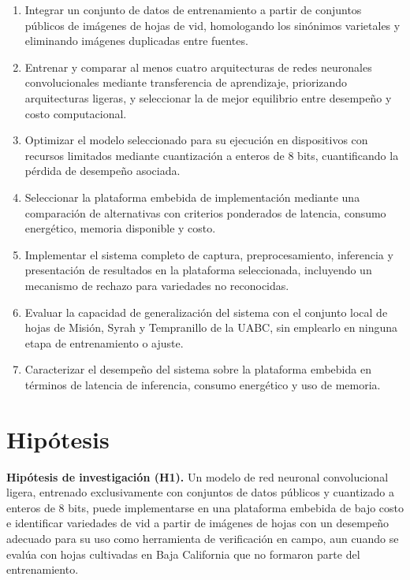 {\renewcommand{\labelenumi}{\textbf{OE\arabic{enumi}.}}
\begin{enumerate}
    \item Integrar un conjunto de datos de entrenamiento a partir de
    conjuntos públicos de imágenes de hojas de vid, homologando los
    sinónimos varietales y eliminando imágenes duplicadas entre fuentes.
    \item Entrenar y comparar al menos cuatro arquitecturas de redes
    neuronales convolucionales mediante transferencia de aprendizaje,
    priorizando arquitecturas ligeras, y seleccionar la de mejor equilibrio
    entre desempeño y costo computacional.
    \item Optimizar el modelo seleccionado para su ejecución en dispositivos
    con recursos limitados mediante cuantización a enteros de 8 bits,
    cuantificando la pérdida de desempeño asociada.
    \item Seleccionar la plataforma embebida de implementación mediante una
    comparación de alternativas con criterios ponderados de latencia,
    consumo energético, memoria disponible y costo.
    \item Implementar el sistema completo de captura, preprocesamiento,
    inferencia y presentación de resultados en la plataforma seleccionada,
    incluyendo un mecanismo de rechazo para variedades no reconocidas.
    \item Evaluar la capacidad de generalización del sistema con el conjunto
    local de hojas de Misión, Syrah y Tempranillo de la UABC, sin emplearlo
    en ninguna etapa de entrenamiento o ajuste.
    \item Caracterizar el desempeño del sistema sobre la plataforma
    embebida en términos de latencia de inferencia, consumo energético y uso
    de memoria.
\end{enumerate}}

\section{Hipótesis}

\textbf{Hipótesis de investigación (H1).} Un modelo de red neuronal
convolucional ligera, entrenado exclusivamente con conjuntos de datos
públicos y cuantizado a enteros de 8 bits, puede implementarse en una
plataforma embebida de bajo costo e identificar variedades de vid a partir
de imágenes de hojas con un desempeño adecuado para su uso como herramienta
de verificación en campo, aun cuando se evalúa con hojas cultivadas en Baja
California que no formaron parte del entrenamiento.

